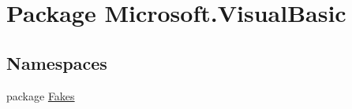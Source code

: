 \hypertarget{namespace_microsoft_1_1_visual_basic}{\section{Package Microsoft.\-Visual\-Basic}
\label{namespace_microsoft_1_1_visual_basic}
}
\subsection*{Namespaces}
\begin{DoxyCompactItemize}
\item 
package \hyperlink{namespace_microsoft_1_1_visual_basic_1_1_fakes}{Fakes}
\end{DoxyCompactItemize}
